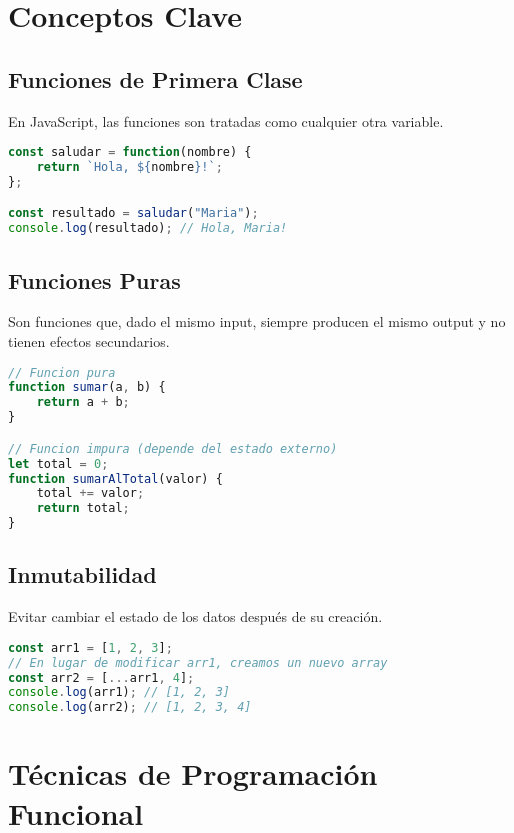 \documentclass{book}
\begin{document}
\section{Conceptos Clave}

\subsection{Funciones de Primera Clase}

En JavaScript, las funciones son tratadas como cualquier otra variable.

\begin{lstlisting}[language=JavaScript]
const saludar = function(nombre) {
    return `Hola, ${nombre}!`;
};

const resultado = saludar("Maria");
console.log(resultado); // Hola, Maria!
\end{lstlisting}

\subsection{Funciones Puras}

Son funciones que, dado el mismo input, siempre producen el mismo output y no tienen efectos secundarios.

\begin{lstlisting}[language=JavaScript]
// Funcion pura
function sumar(a, b) {
    return a + b;
}

// Funcion impura (depende del estado externo)
let total = 0;
function sumarAlTotal(valor) {
    total += valor;
    return total;
}
\end{lstlisting}

\subsection{Inmutabilidad}

Evitar cambiar el estado de los datos después de su creación.

\begin{lstlisting}[language=JavaScript]
const arr1 = [1, 2, 3];
// En lugar de modificar arr1, creamos un nuevo array
const arr2 = [...arr1, 4]; 
console.log(arr1); // [1, 2, 3]
console.log(arr2); // [1, 2, 3, 4]
\end{lstlisting}

\section{Técnicas de Programación Funcional}
\end{document}
